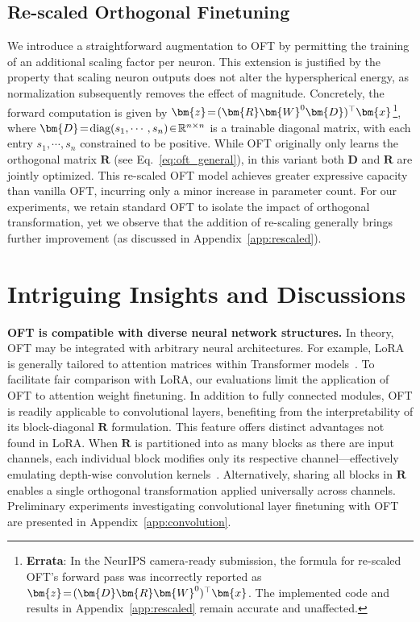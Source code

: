 \subsection{Re-scaled Orthogonal Finetuning}

We introduce a straightforward augmentation to OFT by permitting the training of an additional scaling factor per neuron. This extension is justified by the property that scaling neuron outputs does not alter the hyperspherical energy, as normalization subsequently removes the effect of magnitude. Concretely, the forward computation is given by $\thickmuskip=2mu \medmuskip=2mu\bm{z}=(\bm{R}\bm{W}^0\bm{D})^\top\bm{x}$\footnote{\textbf{Errata}: In the NeurIPS camera-ready submission, the formula for re-scaled OFT's forward pass was incorrectly reported as $\thickmuskip=2mu \medmuskip=2mu\bm{z}=(\bm{D}\bm{R}\bm{W}^0)^\top\bm{x}$. The implemented code and results in Appendix~\ref{app:rescaled} remain accurate and unaffected.}, where $\thickmuskip=2mu \medmuskip=2mu \bm{D}=\text{diag}(s_1,\cdots,s_n)\in\mathbb{R}^{n\times n}$ is a trainable diagonal matrix, with each entry $s_1,\cdots,s_n$ constrained to be positive. While OFT originally only learns the orthogonal matrix $\bm{R}$ (see Eq.~\eqref{eq:oft_general}), in this variant both $\bm{D}$ and $\bm{R}$ are jointly optimized. This re-scaled OFT model achieves greater expressive capacity than vanilla OFT, incurring only a minor increase in parameter count. For our experiments, we retain standard OFT to isolate the impact of orthogonal transformation, yet we observe that the addition of re-scaling generally brings further improvement (as discussed in Appendix~\ref{app:rescaled}).

\section{Intriguing Insights and Discussions}

\textbf{OFT is compatible with diverse neural network structures.} In theory, OFT may be integrated with arbitrary neural architectures. For example, LoRA is generally tailored to attention matrices within Transformer models~\cite{hulora2022}. To facilitate fair comparison with LoRA, our evaluations limit the application of OFT to attention weight finetuning. In addition to fully connected modules, OFT is readily applicable to convolutional layers, benefiting from the interpretability of its block-diagonal $\bm{R}$ formulation. This feature offers distinct advantages not found in LoRA. When $\bm{R}$ is partitioned into as many blocks as there are input channels, each individual block modifies only its respective channel—effectively emulating depth-wise convolution kernels~\cite{chollet2017xception}. Alternatively, sharing all blocks in $\bm{R}$ enables a single orthogonal transformation applied universally across channels. Preliminary experiments investigating convolutional layer finetuning with OFT are presented in Appendix~\ref{app:convolution}.

